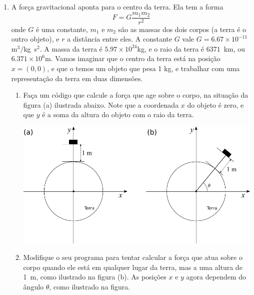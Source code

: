 \documentclass[10pt,a4paper,ssfamily]{exam}
\begin{document}
\begin{enumerate}
\item
A força gravitacional aponta para o centro da terra. Ela tem a forma
\[
F = G \frac{m_1 m_2}{r^2}
\] 
onde $G$ é uma constante, $m_1$ e $m_2$ são as massas dos dois corpos (a
terra é o outro objeto), e $r$ a distância entre eles. A constante $G$
vale $G = 6.67\times 10^{-11}$m$^3/$kg~s$^2$. A massa da terra é
$5.97\times 10^{24}$kg, e o raio da terra é $6371$~km, ou 
$6.371 \times 10^{6}$m.
Vamos imaginar que o centro da terra está na posição $x=(0,0)$, e que o
temos um objeto que pesa 1 kg, e trabalhar com uma representação da
terra em duas dimensões. 
\begin{enumerate}
\item
Faça um código que calcule a força que age sobre o corpo, na situação
da figura (a) ilustrada abaixo. Note que a coordenada $x$ do objeto é
zero, e que $y$ é a soma da altura do objeto com o raio da terra. 
\begin{center}
\includegraphics[width=12cm]{./figuras/terra.pdf}
\end{center}
\item
Modifique o seu programa para tentar calcular a força que atua sobre o
corpo quando ele está em qualquer lugar da terra, mas a uma altura de
1~m, como ilustrado na figura (b). As posições $x$ e $y$ agora dependem
do ângulo $\theta$, como ilustrado na figura. 
\end{enumerate}


\end{enumerate}
\end{document}
